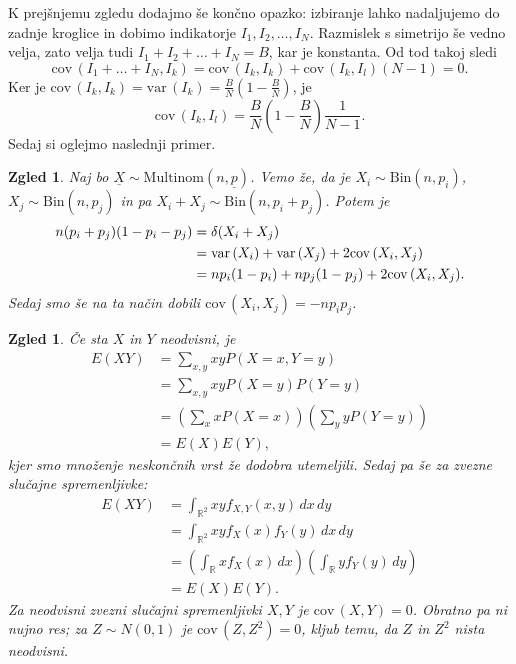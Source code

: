 \documentclass[10pt, a4paper]{article}
\newtheorem{zgled}[izr]{Zgled}
\newcommand{\R}{\mathbb {R}}
\newcommand{\vari}{\mathrm{var}\,}
\newcommand{\cov}{\mathrm{cov}\,}
\begin{document}
K prejšnjemu zgledu dodajmo še končno opazko: izbiranje lahko nadaljujemo 
do zadnje kroglice in dobimo indikatorje $I_1, I_2, \dots, I_N$.
Razmislek s simetrijo še vedno velja, zato velja tudi 
$I_1 + I_2 + \dots + I_N = B$, kar je konstanta.
Od tod takoj sledi 
\begin{equation*}
  \cov(I_1 + \dots + I_N, I_k) = \cov(I_k, I_k) + \cov(I_k, I_l) (N - 1) = 0.
\end{equation*}
Ker je $\cov(I_k, I_k) = \vari(I_k) = \frac{B}{N} \left(1 - \frac{B}{N}\right)$,
je $$\cov(I_k, I_l) = \frac{B}{N} \left(1 - \frac{B}{N}\right) \frac{1}{N - 1}.$$
Sedaj si oglejmo naslednji primer.
\begin{zgled}
  Naj bo $\underline{X} \sim \mathrm{Multinom} (n, \underline{p})$.
  Vemo že, da je $X_i \sim \mathrm{Bin} (n, p_i)$, $X_j \sim \mathrm{Bin} (n, p_j)$ in pa 
  $X_i + X_j \sim \mathrm{Bin} (n, p_i + p_j)$. Potem je 
  \begin{align*}
    n(p_i + p_j) (1 - p_i - p_j) &= \var(X_i + X_j)\\
    &= \vari(X_i) + \vari(X_j) + 2 \cov(X_i, X_j)\\
    &= np_i(1 - p_i) + np_j (1 - p_j) + 2 \cov(X_i, X_j).
  \end{align*}
  Sedaj smo še na ta način dobili $\cov(X_i, X_j) = -n p_i p_j$.
\end{zgled}

\begin{zgled}
  Če sta $X$ in $Y$ neodvisni, je 
  \begin{align*}
    E(XY) &= \sum_{x, y} xy P(X = x, Y = y)\\
    &= \sum_{x, y} xy P(X = y) P(Y = y)\\
    &= \left(\sum_x xP(X = x)\right) \left(\sum_y yP(Y = y)\right)\\
    &= E(X) E(Y),
  \end{align*}
  kjer smo množenje neskončnih vrst že dodobra utemeljili.
  Sedaj pa še za zvezne slučajne spremenljivke:
  \begin{align*}
    E(XY) &= \int_{\R^2} xy f_{X, Y} (x, y)\, dx\, dy\\
    &= \int_{\R^2} xy f_X (x) f_Y (y)\, dx\, dy\\
    &= \left(\int_{\R} x f_X (x)\, dx\right) \left(\int_{\R} y f_Y (y)\, dy\right)\\
    &= E(X) E(Y).
  \end{align*}
  Za neodvisni zvezni slučajni spremenljivki $X, Y$ je $\cov(X, Y) = 0$.
  Obratno pa ni nujno res; za $Z \sim N(0, 1)$ je $\cov(Z, Z^2) = 0$,
  kljub temu, da $Z$ in $Z^2$ nista neodvisni.
\end{zgled}
\end{document}

